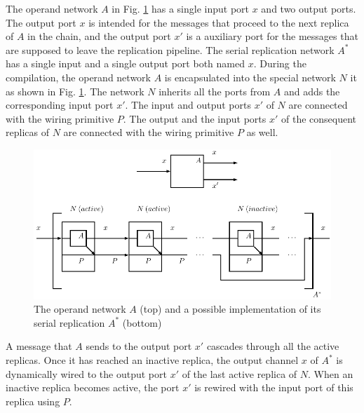 The operand network $A$ in Fig. \ref{fig:ffp_new} has a single input port $x$ and two output ports. The output port $x$ is intended for the messages that proceed to the next replica of $A$ in the chain, and the output port $x'$ is a auxiliary port for the messages that are supposed to leave the replication pipeline. The serial replication network $A^{*}$ has a single input and a single output port both named $x$. During the compilation, the operand network $A$ is encapsulated into the special network $N$ it as shown in Fig. \ref{fig:ffp_new}. The network $N$ inherits all the ports from $A$ and adds the corresponding input port $x'$. The input and output ports $x'$ of $N$ are connected with the wiring primitive $P$. The output and the input ports $x'$ of the consequent replicas of $N$ are connected with the wiring primitive $P$ as well.
\begin{figure}[h!]
\centering
\includegraphics[scale=0.8]{figs/chapter_04_ffp_new.pdf}
\caption{The operand network $A$ (top) and a possible implementation of its serial replication $A^{*}$ (bottom)}
\label{fig:ffp_new}
\end{figure}
A message that $A$ sends to the output port $x'$ cascades through all the active replicas. Once it has reached an inactive replica, the output channel $x$ of $A^{*}$ is dynamically wired to the output port $x'$ of the last active replica of $N$. When an inactive replica becomes active, the port $x'$ is rewired with the input port of this replica using $P$.



%



